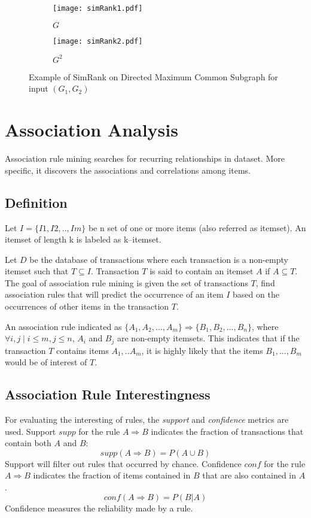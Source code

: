 \begin{figure}[t]
	\begin{subfigure}{.35\textwidth}
		\centering
		\texttt{[image: simRank1.pdf]}
		\caption{$G$}
		\label{fig:simrank1}
	\end{subfigure}%
	\begin{subfigure}{.65\textwidth}
		\centering
		\texttt{[image: simRank2.pdf]}
		\caption{$G^{2}$}
		\label{fig:simrank2}
	\end{subfigure}
	\caption{Example of SimRank on Directed Maximum Common Subgraph for input $(G_{1},G_{2})$ }
	\label{fig:simrank}
\end{figure}

\section{Association Analysis}
Association rule mining searches for recurring relationships in dataset.
More specific, it discovers the associations and correlations among items\cite{Han:2005:DMC:1076797}.
\subsection{Definition}
Let $I=\{I1,I2,..,Im\}$ be n set of one or more items (also referred as itemset).
An itemset of length k is labeled as k--itemset.

Let $D$ be the database of transactions where each transaction is a non-empty itemset such that $T \subseteq I$.
Transaction $T$ is said to contain an itemset $A$  if $A\subseteq T$.
The goal of association rule mining is given the set of transactions $T$, 
find association rules that will predict the occurrence of an item $I$ based on the occurrences of other items in the transaction $T$.

An association rule indicated as 
$\{A_{1},A_{2},...,A_{m}\}\Rightarrow \{B_{1},B_{2},...,B_{n}\}$, 
where $\forall i,j \mid i\leq m,j\leq n$, $A_{i}$ and $B_{j}$ are non-empty itemsets. This indicates that if the transaction $T$ contains items $A_{1},..A_{m}$, it is highly likely that the items $B_{1},...,B_{m}$ would be of interest of $T$.
\subsection{Association Rule Interestingness }
For evaluating the interesting of rules, the \emph{support} and \emph{confidence} metrics are used.
Support $supp$ for the rule $A\Rightarrow B$ indicates the fraction of transactions that contain both $A$ and $B$:
\begin{equation}
	supp(A\Rightarrow B) = P(A\cup B)
\end{equation}
Support will filter out rules that occurred by chance.
Confidence $conf$ for the rule $A\Rightarrow B$ indicates the fraction of items contained in $B$ that are also contained in $A$.
\begin{equation}
	conf(A \Rightarrow B) = P(B|A)
\end{equation}
Confidence measures the reliability made by a rule.

